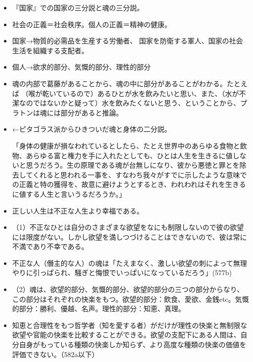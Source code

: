 \documentclass[dvipdfmx]{jsarticle}
\begin{document}
\begin{itemize}

\item 『国家』での国家の三分説と魂の三分説。

\item 社会の正義＝社会秩序。個人の正義＝精神の健康。

\item 国家→物質的必需品を生産する労働者、
  国家を防衛する軍人、国家の社会生活を組織する支配者。


\item 個人→欲求的部分、気慨的部分、理性的部分

\item 魂の内部で葛藤があることから、魂の中に部分があることがわかる。たとえば （喉が乾いているので）あるひとが水を飲みたいと思い、また、（水が不潔なのではないかと疑って）水を飲みたくないと思う、ということから、プラトンは魂には部分があると推論。
\item ←ピタゴラス派からひきついだ魂と身体の二分説。

  「身体の健康が損なわれているとしたら、たとえ世界中のあらゆる食物と飲物、あらゆる富と権力を手に入れたとしても、ひとは人生を生きるに値しないと思うだろう。生の原理である魂が台無しになり、彼から悪徳と罪とを除去してくれると思われる一事を、すなわち我々がすでに示したような意味での正義と特の獲得を、故意に避けようとするとき、われわれはそれを生きるに値する人生と言いうるだろうか。」
\item 正しい人生は不正な人生より幸福である。

\item （1）不正なひとは自分のさまざまな欲望をなにも制限しないので彼の欲望には限度がない。しかし欲望を満しつづけることはできないので、彼は常に不満であり不幸である。

\item 不正な人（僭主的な人）の魂は「たえまなく、激しい欲望の刺によって無理やりに引っぱられ、騒ぎと悔恨でいっぱいになっているだろう」(577b)


\item （2）魂は、欲望的部分、気慨的部分、欲望的部分の三つの部分からなり、この部分はそれぞれの快楽をもつ。欲望的部分：飲食、愛欲、金銭etc。気慨的部分：勝利、優越、名声。理性的部分：知恵、真理。


\item 知恵と合理性をもつ哲学者（知を愛する者）がだけが理性の快楽と無制限な欲望や官能の快楽を比較することができる。欲望の支配下にある人間は、自分自身がもっている種類の快楽しか知らず、より高度な種類の快楽の価値を評価できない。（582a以下）


\end{itemize}
\end{document}
